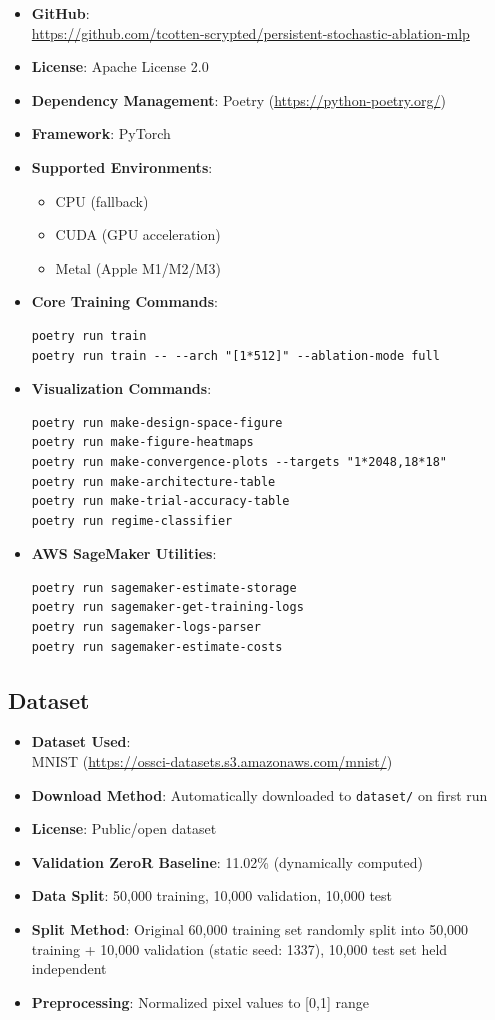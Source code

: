 \documentclass[conference]{IEEEtran}
\begin{document}
\begin{itemize}
  \item \textbf{GitHub}:\\
  \url{https://github.com/tcotten-scrypted/persistent-stochastic-ablation-mlp}
  \item \textbf{License}: Apache License 2.0
  \item \textbf{Dependency Management}: Poetry (\url{https://python-poetry.org/})
  \item \textbf{Framework}: PyTorch
  \item \textbf{Supported Environments}:
    \begin{itemize}
      \item CPU (fallback)
      \item CUDA (GPU acceleration)
      \item Metal (Apple M1/M2/M3)
    \end{itemize}
  \item \textbf{Core Training Commands}:
\begin{verbatim}
poetry run train
poetry run train -- --arch "[1*512]" --ablation-mode full
\end{verbatim}
  \item \textbf{Visualization Commands}:
\begin{verbatim}
poetry run make-design-space-figure
poetry run make-figure-heatmaps
poetry run make-convergence-plots --targets "1*2048,18*18"
poetry run make-architecture-table
poetry run make-trial-accuracy-table
poetry run regime-classifier
\end{verbatim}
  \item \textbf{AWS SageMaker Utilities}:
\begin{verbatim}
poetry run sagemaker-estimate-storage
poetry run sagemaker-get-training-logs
poetry run sagemaker-logs-parser
poetry run sagemaker-estimate-costs
\end{verbatim}
\end{itemize}

\subsection*{Dataset}

\begin{itemize}
  \item \textbf{Dataset Used}:\\
  MNIST (\url{https://ossci-datasets.s3.amazonaws.com/mnist/})
  \item \textbf{Download Method}: Automatically downloaded to \texttt{dataset/} on first run
  \item \textbf{License}: Public/open dataset
  \item \textbf{Validation ZeroR Baseline}: 11.02\% (dynamically computed)
  \item \textbf{Data Split}: 50,000 training, 10,000 validation, 10,000 test
  \item \textbf{Split Method}: Original 60,000 training set randomly split into 50,000 training + 10,000 validation (static seed: 1337), 10,000 test set held independent
  \item \textbf{Preprocessing}: Normalized pixel values to [0,1] range
\end{itemize}
\end{document}
